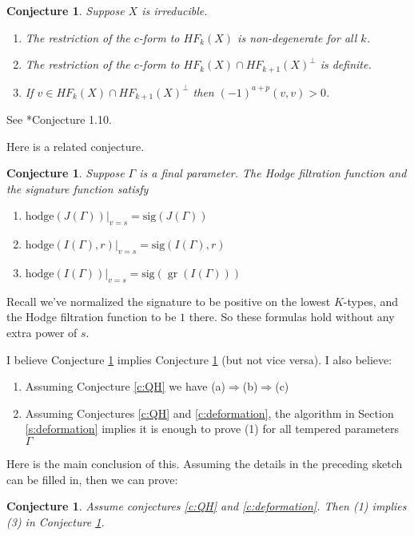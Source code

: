 \documentclass[12pt,leqno]{article}
\newtheorem{conjecture}[equation]{Conjecture}
\newcommand{\sig}{\text{sig}}
\newcommand{\hodge}{\text{hodge}}
\DeclareMathOperator{\gr}{\text{gr}}
\begin{document}
\begin{conjecture}
\label{c:sv}
Suppose $X$ is irreducible.
\begin{enumerate}
\item[(1)] The restriction of the $c$-form to $HF_k(X)$ is non-degenerate for all $k$.
\item[(2)] The restriction of the $c$-form to $HF_k(X)\cap HF_{k+1}(X)^\perp$ is definite.
\item[(3)] If $v\in HF_k(X)\cap HF_{k+1}(X)^\perp$ then $(-1)^{a+p}(v,v)>0$.
\end{enumerate}
\end{conjecture}
See \cite{schmid_vilonen_hodge_theory}*{Conjecture 1.10}.

Here is a related conjecture.

\begin{conjecture}
\label{c:functions}
Suppose $\Gamma$ is a final parameter.
The Hodge filtration function and the signature function satisfy
\normalfont
\begin{enumerate}
\item[(a)]$\hodge(J(\Gamma))|_{v=s}=\sig(J(\Gamma))$
\item[(b)]  $\hodge(I(\Gamma),r)|_{v=s}=\sig(I(\Gamma),r)$
\item[(c)]  $\hodge(I(\Gamma))|_{v=s}=\sig(\gr(I(\Gamma)))$
\end{enumerate}
\end{conjecture}


Recall we've normalized the signature to be positive on the lowest $K$-types, and the Hodge filtration function to be $1$ there.
So these formulas hold without any extra power of $s$.

I believe Conjecture \ref{c:sv} implies Conjecture \ref{c:functions} (but not vice versa).
I also believe:

\begin{enumerate}
\item[(1)] Assuming Conjecture \ref{c:QH} we have (a)$\Rightarrow$(b)$\Rightarrow$(c)
\item[(2)] Assuming Conjectures \ref{c:QH} and \ref{c:deformation}, the algorithm in Section \ref{s:deformation}
implies it is enough to prove (1) for all tempered parameters $\Gamma$
\end{enumerate}

Here is the main conclusion of this. Assuming the details in the preceding sketch can be filled in, then we can prove:
\begin{conjecture}
Assume conjectures \ref{c:QH} and \ref{c:deformation}. Then (1) implies (3) in Conjecture \ref{c:sv}.
\end{conjecture}
\end{document}
